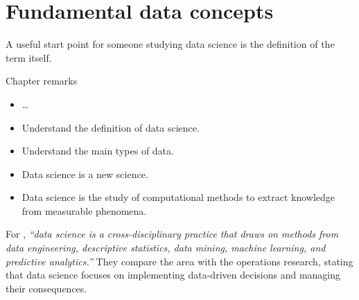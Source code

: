 \chapter{Fundamental data concepts}
\label{chap:data}



A useful start point for someone studying data science is the definition of the term
itself.

\begin{mainbox}{Chapter remarks}

  \begin{itemize}
    \item \dots
  \end{itemize}


  \begin{itemize}
    \item Understand the definition of data science.
    \item Understand the main types of data.
  \end{itemize}


  \begin{itemize}
    \item Data science is a new science.
    \item Data science is the study of computational methods to extract knowledge from
      measurable phenomena.
  \end{itemize}
\end{mainbox}

For \textcite{Zumel2019}, \emph{``data science is a cross-disciplinary practice that draws
on methods from data engineering, descriptive statistics, data mining, machine learning,
and predictive analytics.''}  They compare the area with the operations research, stating
that data science focuses on implementing data-driven decisions and managing their
consequences.

